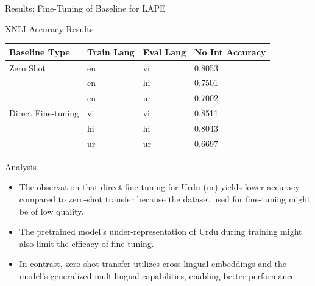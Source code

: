 \documentclass[aspectratio=169]{beamer}
\begin{document}
\begin{frame}{Results: Fine-Tuning of Baseline for LAPE}
	\begin{block}{\scriptsize XNLI Accuracy Results}\scriptsize
		\begin{table}[ht]
			\centering
			\renewcommand{\arraystretch}{1.3}
			\setlength{\tabcolsep}{8pt}
			\begin{tabularx}{\textwidth}{|X|X|X|X|}
				\hline
				\textbf{Baseline Type} & \textbf{Train Lang} & \textbf{Eval Lang} & \textbf{No Int Accuracy} \\
				\hline
				Zero Shot & en & vi & 0.8053 \\
				& en & hi & 0.7501 \\
				& en & ur & 0.7002 \\
				\hline
				Direct Fine-tuning & vi & vi & 0.8511 \\
				& hi & hi & 0.8043 \\
				& ur & ur & 0.6697 \\
				\hline
			\end{tabularx}
		\end{table}
	\end{block}
	\begin{block}{\scriptsize Analysis}\scriptsize
		\begin{itemize}
			\item The observation that direct fine-tuning for Urdu (ur) yields lower accuracy compared to zero-shot transfer because  the dataset used for fine-tuning might be of low quality.
			\item The pretrained model’s under-representation of Urdu during training might also limit the efficacy of fine-tuning.
			\item In contrast, zero-shot transfer utilizes cross-lingual embeddings and the model’s generalized multilingual capabilities, enabling better performance.
		\end{itemize}
	\end{block}
\end{frame}
	
\end{document}
